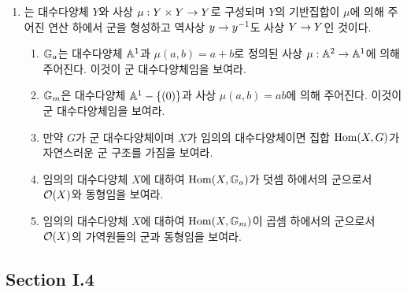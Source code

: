 \begin{enumerate}[label=\tb{3.\arabic*.},itemindent=0mm,itemsep=4mm]
		\sol
		\item {} 는 대수다양체 $Y$와 사상 $\mu:Y\times Y\rightarrow Y$로 구성되며
		$Y$의 기반집합이 $\mu$에 의해 주어진 연산 하에서 군을 형성하고 역사상 $y\rightarrow y^{-1}$도 사상 $Y\rightarrow Y$인 것이다.
		\begin{enumerate}[label=(\alph*)]
		\item {} $\mathbb{G}_a$는 대수다양체 $\mathbb{A}^1$과 $\mu(a,b)=a+b$로 정의된 사상
		$\mu:\mathbb{A}^2\rightarrow\mathbb{A}^1$에 의해 주어진다. 이것이 군 대수다양체임을 보여라.
		\item {} $\mathbb{G}_m$은 대수다양체 $\mathbb{A}^1-\{(0)\}$과 사상 $\mu(a,b)=ab$에 의해 주어진다.
		이것이 군 대수다양체임을 보여라.
		\item 만약 $G$가 군 대수다양체이며 $X$가 임의의 대수다양체이면 집합 $\operatorname{Hom}(X,G)$가 자연스러운 군 구조를 가짐을 보여라.
		\item 임의의 대수다양체 $X$에 대하여 $\operatorname{Hom}(X,\mathbb{G}_a)$가 덧셈 하에서의 군으로서 $\mathcal{O}(X)$와 동형임을 보여라.
		\item 임의의 대수다양체 $X$에 대하여 $\operatorname{Hom}(X,\mathbb{G}_m)$이 곱셈 하에서의 군으로서 $\mathcal{O}(X)$의 가역원들의 군과 동형임을 보여라.
		\end{enumerate}
		\sol
	\end{enumerate}
	
	
	\subsection*{Section I.4}
	
